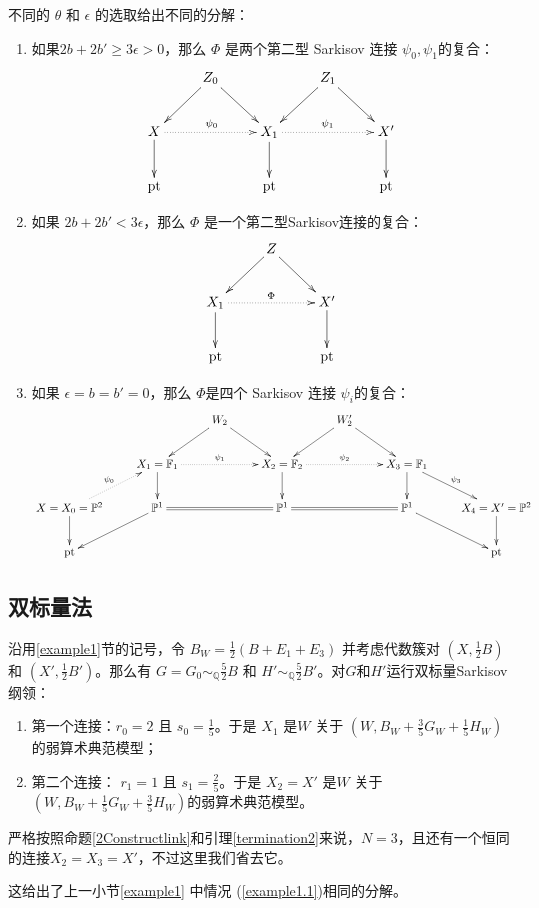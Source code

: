 不同的 $\theta$ 和  $\epsilon$ 的选取给出不同的分解：
\begin{enumerate}
  \item\label{example1.1} 如果$ 2b+2b'\geqslant 3\epsilon>0 $，那么  $\Phi$ 是两个第二型 Sarkisov 连接 $\psi_{0},\psi_{1}$的复合： 
    \[ \xymatrix{
        &Z_{0}\ar[rd]\ar[ld] & &Z_{1}\ar[rd]\ar[ld]\\
        X\ar[d]\ar@{.>}[rr]^{\psi_{0}}& &X_{1}\ar@{.>}[rr]^{\psi_{1}}\ar[d]&&X'\ar[d]\\
        \text{pt}&&\text{pt}&&\text{pt} } \]
  \item 如果 $ 2b+2b'< 3\epsilon $，那么 $\Phi$ 是一个第二型Sarkisov连接的复合：
        \[ \xymatrix{
            &Z\ar[rd]\ar[ld] & \\
            X_{1}\ar@{.>}[rr]^{\Phi}\ar[d]& &X'\ar[d]\\
            \text{pt}&&\text{pt} } \]
  \item 如果 $ \epsilon=b=b'=0 $，那么 $\Phi$是四个 Sarkisov 连接 $\psi_{i}$的复合：
        \[ \xymatrix{
          &&W_2\ar[ld]\ar[rd]&&W_2'\ar[ld]\ar[rd]\\
          &X_1=\mathbb{F}_1\ar@{.>}[rr]^{\psi_{1}}\ar[d]&&X_2=\mathbb{F}_2\ar@{.>}[rr]^{\psi_{2}}\ar[d]&&X_3=\mathbb{F}_1\ar[d]\ar[rd]^{\psi_{3}}\\
          X=X_0=\mathbb{P}^2\ar[d]\ar@{.>}[ru]^{\psi_{0}}&\mathbb{P}^1\ar[ld]\ar@{=}[rr]&&\mathbb{P}^1\ar@{=}[rr]&&\mathbb{P}^1\ar[rd]&X_4=X'=\mathbb{P}^2\ar[d]\\
          \text{pt}&&&&&&\text{pt} } \]
\end{enumerate}

\subsection{双标量法}
沿用\ref{example1}节的记号，令 $B_{W}=\frac{1}{2}(B+E_{1}+E_{3})$ 并考虑代数簇对 $(X,\frac{1}{2}B)$ 和 $(X',\frac{1}{2}B')$。那么有 $G=G_{0}\sim_{\mathbb{Q}}\frac{5}{2}B$ 和 $H'\sim_{\mathbb{Q}}\frac{5}{2}B'$。对$G$和$H'$运行双标量Sarkisov纲领：
\begin{enumerate}
  \item 第一个连接：$r_{0}=2$ 且 $s_{0}=\frac{1}{5}$。于是 $X_{1}$ 是$W$  关于 $(W,B_{W}+\frac{3}{5}G_{W}+\frac{1}{5}H_{W})$的弱算术典范模型；
  \item 第二个连接： $r_{1}=1$ 且 $s_{1}=\frac{2}{5}$。于是 $X_{2}= X'$ 是$W$ 关于  $(W,B_{W}+\frac{1}{5}G_{W}+\frac{3}{5}H_{W})$的弱算术典范模型。
\end{enumerate}
\begin{remark}
严格按照命题\ref{2Constructlink}和引理\ref{termination2}来说，$N=3 $，且还有一个恒同的连接$X_{2}=X_{3}=X' $，不过这里我们省去它。
\end{remark}
\begin{remark}
  这给出了上一小节\ref{example1} 中情况 (\ref{example1.1})相同的分解。
\end{remark}

